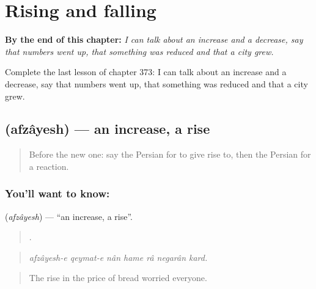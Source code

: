 
\chapter{Rising and falling}
\label{ch:fa-rising-and-falling}

\begin{chapteropening}
\textbf{By the end of this chapter:} \emph{I can talk about an increase and a decrease, say that numbers went up, that something was reduced and that a city grew.}

Complete the last lesson of chapter 373: I can talk about an increase and a decrease, say that numbers went up, that something was reduced and that a city grew.
\end{chapteropening}

\section[\texorpdfstring{\fa{افزایش} (afzâyesh)}{افزایش (afzâyesh)}]{ (afzâyesh) — an increase, a rise}

\label{lesson:FA-C373-afzayesh}



\begin{quote}
Before the new one: say the Persian for to give rise to, then the Persian for a reaction.
\end{quote}

\subsection*{You'll want to know: }
\textbf{} (\emph{afzâyesh}) — \textquotedblleft{}an increase, a rise\textquotedblright{}.

\begin{quote}
      .
\end{quote}

\begin{quote}
\emph{afzâyesh-e qeymat-e nân hame râ negarân kard.}
\end{quote}

\begin{quote}
The rise in the price of bread worried everyone.
\end{quote}

